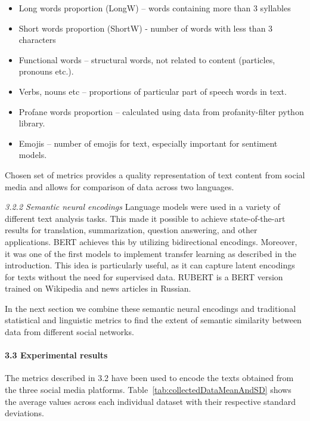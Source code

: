 \begin{itemize}
	\item Long words proportion (LongW) -- words containing more than 3 syllables
	
	\item Short words proportion (ShortW) - number of words with less than 3 characters 
	
	\item Functional words -- structural words, not related to content (particles, pronouns etc.).
	
	\item Verbs, nouns etc -- proportions of particular part of speech words in text.
	
	\item Profane words proportion -- calculated using data from profanity-filter python library.
	
	\item Emojis -- number of emojis for text, especially important for sentiment models.
\end{itemize}

Chosen set of metrics provides a quality representation of text content from social media and allows for comparison of data across two languages.

\textit{3.2.2 Semantic neural encodings} Language models were used in a variety of different text analysis tasks. This made it possible to achieve state-of-the-art results for translation, summarization, question answering, and other applications. BERT \cite{TenneyDasPavlick} achieves this by utilizing bidirectional encodings. Moreover, it was one of the first models to implement transfer learning as described in the introduction. This idea is particularly useful, as it can capture latent encodings for texts without the need for supervised data. RUBERT \cite{KuratovArkhipov} is a BERT version trained on Wikipedia and news articles in Russian.

In the next section we combine these semantic neural encodings and traditional statistical and linguistic metrics to find the extent of semantic similarity between data from different social networks.

\paragraph{3.3 Experimental results} The metrics described in 3.2 have been used to encode the texts obtained from the three social media platforms. Table~\cref{tab:collectedDataMeanAndSD} shows the average values across each individual dataset with their respective standard deviations.

